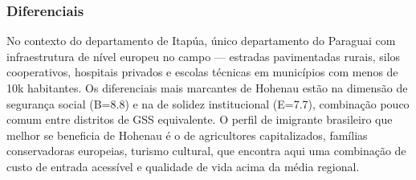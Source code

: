 \subsubsection*{Diferenciais}\label{dif-hohenau-0714}
No contexto do departamento de Itapúa, único departamento do Paraguai com infraestrutura de nível europeu no campo — estradas pavimentadas rurais, silos cooperativos, hospitais privados e escolas técnicas em municípios com menos de 10k habitantes. Os diferenciais mais marcantes de Hohenau estão na dimensão de segurança social (B=8.8) e na de solidez institucional (E=7.7), combinação pouco comum entre distritos de GSS equivalente. O perfil de imigrante brasileiro que melhor se beneficia de Hohenau é o de agricultores capitalizados, famílias conservadoras europeias, turismo cultural, que encontra aqui uma combinação de custo de entrada acessível e qualidade de vida acima da média regional.
